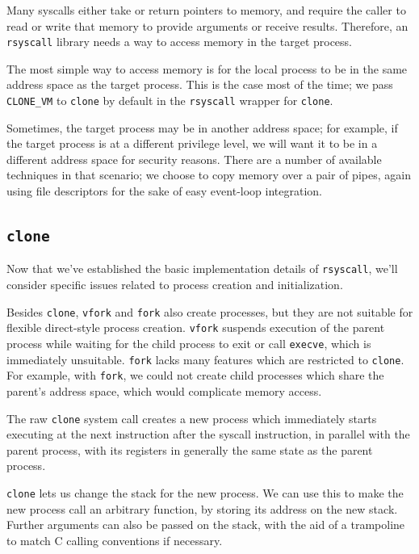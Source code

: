 \documentclass[letterpaper,twocolumn,10pt]{article}
\begin{document}
Many syscalls either take or return pointers to memory,
and require the caller to read or write that memory to provide arguments or receive results.
Therefore, an \texttt{rsyscall} library needs a way to access memory in the target process.

The most simple way to access memory is for the local process to be in the same address space as the target process.
This is the case most of the time; we pass \verb|CLONE_VM| to \texttt{clone} by default
in the \texttt{rsyscall} wrapper for \texttt{clone}.

Sometimes, the target process may be in another address space;
for example, if the target process is at a different privilege level,
we will want it to be in a different address space for security reasons.\cite{vfork_dangerous}
There are a number of available techniques in that scenario;
we choose to copy memory over a pair of pipes,
again using file descriptors for the sake of easy event-loop integration.
\subsection{\texttt{clone}}\label{clone}
Now that we've established the basic implementation details of \texttt{rsyscall},
we'll consider specific issues related to process creation and initialization.

Besides \texttt{clone}, \texttt{vfork} and \texttt{fork} also create processes,
but they are not suitable for flexible direct-style process creation.
\texttt{vfork} suspends execution of the parent process
while waiting for the child process to exit or call \texttt{execve},
which is immediately unsuitable.\cite{vfork}
\texttt{fork} lacks many features which are restricted to \texttt{clone}.
For example, with \texttt{fork},
we could not create child processes which share the parent's address space,
which would complicate memory access.

The raw \texttt{clone} system call creates a new process
which immediately starts executing at the next instruction after the syscall instruction,
in parallel with the parent process,
with its registers in generally the same state as the parent process.

\texttt{clone} lets us change the stack for the new process.
We can use this to make the new process call an arbitrary function,
by storing its address on the new stack.
Further arguments can also be passed on the stack,
with the aid of a trampoline to match C calling conventions if necessary.
\end{document}
